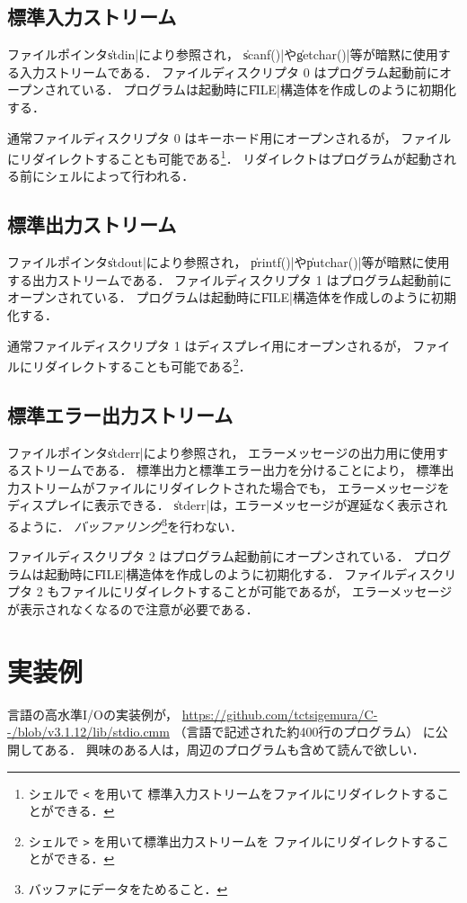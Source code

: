 \subsection{標準入力ストリーム}
ファイルポインタ\|stdin|により参照され，
\|scanf()|や\|getchar()|等が暗黙に使用する入力ストリームである．
ファイルディスクリプタ 0 はプログラム起動前にオープンされている．
プログラムは起動時に\|FILE|構造体を作成しのように初期化する．

通常ファイルディスクリプタ 0 はキーホード用にオープンされるが，
ファイルにリダイレクトすることも可能である\footnote{
シェルで \texttt{<} を用いて
標準入力ストリームをファイルにリダイレクトすることができる．}．
リダイレクトはプログラムが起動される前にシェルによって行われる．

\subsection{標準出力ストリーム}
ファイルポインタ\|stdout|により参照され，
\|printf()|や\|putchar()|等が暗黙に使用する出力ストリームである．
ファイルディスクリプタ 1 はプログラム起動前にオープンされている．
プログラムは起動時に\|FILE|構造体を作成しのように初期化する．

通常ファイルディスクリプタ 1 はディスプレイ用にオープンされるが，
ファイルにリダイレクトすることも可能である\footnote{
シェルで \texttt{>} を用いて標準出力ストリームを
ファイルにリダイレクトすることができる．
}．

\subsection{標準エラー出力ストリーム}
ファイルポインタ\|stderr|により参照され，
エラーメッセージの出力用に使用するストリームである．
標準出力と標準エラー出力を分けることにより，
標準出力ストリームがファイルにリダイレクトされた場合でも，
エラーメッセージをディスプレイに表示できる．
\|stderr|は，エラーメッセージが遅延なく表示されるように．
\emph{バッファリング}\footnote{バッファにデータをためること．}を行わない．

ファイルディスクリプタ 2 はプログラム起動前にオープンされている．
プログラムは起動時に\|FILE|構造体を作成しのように初期化する．
ファイルディスクリプタ 2 もファイルにリダイレクトすることが可能であるが，
エラーメッセージが表示されなくなるので注意が必要である．

\section{実装例}
\cmm 言語の高水準I/Oの実装例が，
\url{https://github.com/tctsigemura/C--/blob/v3.1.12/lib/stdio.cmm}
（\cmm 言語で記述された約400行のプログラム）
に公開してある．
興味のある人は，周辺のプログラムも含めて読んで欲しい．

